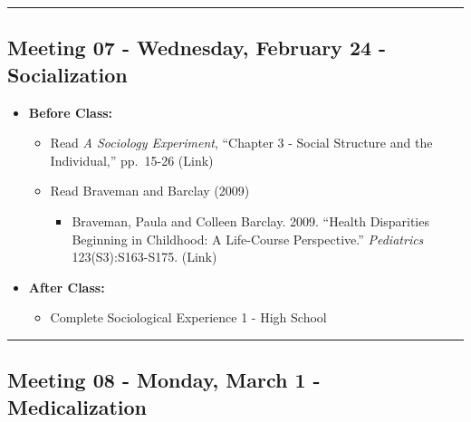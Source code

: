 \documentclass[
]{book}
\providecommand{\tightlist}{%
  \setlength{\itemsep}{0pt}\setlength{\parskip}{0pt}}
\begin{document}
\begin{center}\rule{0.5\linewidth}{0.5pt}\end{center}

\hypertarget{meeting-07---wednesday-february-24---socialization}{%
\subsection*{Meeting 07 - Wednesday, February 24 - Socialization}\label{meeting-07---wednesday-february-24---socialization}}

\begin{itemize}
\tightlist
\item
  \textbf{Before Class:}

  \begin{itemize}
  \tightlist
  \item
    Read \emph{A Sociology Experiment}, ``Chapter 3 - Social Structure and the Individual,'' pp.~15-26 (Link)
  \item
    Read Braveman and Barclay (2009)

    \begin{itemize}
    \tightlist
    \item
      Braveman, Paula and Colleen Barclay. 2009. ``Health Disparities Beginning in Childhood: A Life-Course Perspective.'' \emph{Pediatrics} 123(S3):S163-S175. (Link)
    \end{itemize}
  \end{itemize}
\item
  \textbf{After Class:}

  \begin{itemize}
  \tightlist
  \item
    Complete Sociological Experience 1 - High School
  \end{itemize}
\end{itemize}

\begin{center}\rule{0.5\linewidth}{0.5pt}\end{center}

\hypertarget{meeting-08---monday-march-1---medicalization}{%
\subsection*{Meeting 08 - Monday, March 1 - Medicalization}\label{meeting-08---monday-march-1---medicalization}}
\end{document}
